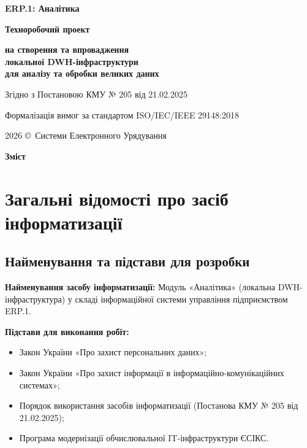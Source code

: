 \documentclass{article}
\newcommand\HUGE[1]{\fontsize{38}{38}\selectfont #1}
\begin{document}
\pagestyle{fancy}

\begin{titlepage}
\AddToShipoutPictureBG*{\AtPageLowerLeft{\color{primary}\rule{\paperwidth}{\paperheight}}}
\color{white}\thispagestyle{empty}\vspace*{3cm}\centering
  {\Huge \textbf{ERP.1: Аналітика} \par} \vspace{1.5cm}
  {\HUGE \textbf{Техноробочий проект} \par} \vspace{1.5cm}
  {\LARGE \textbf{на створення та впровадження \\ локальної DWH-інфраструктури \\ для аналізу та обробки великих даних} \par} \vspace{1.5cm}
  {\large Згідно з Постановою КМУ № 205 від 21.02.2025 \par}
  {\large Формалізація вимог за стандартом ISO/IEC/IEEE 29148:2018 \par}
  \vfill
  {\large 2026 \copyright\ Системи Електронного Урядування \par}
\end{titlepage}

\newpage
\begin{center}
  {\Huge\color{primary}\bfseries Зміст\par}
\end{center}
\vspace{40pt}
\tableofcontents

\newpage
\section{Загальні відомості про засіб інформатизації}

\subsection{Найменування та підстави для розробки}
\textbf{Найменування засобу інформатизації:} Модуль «Аналітика» (локальна DWH-інфраструктура) у складі інформаційної системи управління підприємством ERP.1.

\textbf{Підстави для виконання робіт:}
\begin{itemize}
    \item Закон України «Про захист персональних даних»;
    \item Закон України «Про захист інформації в інформаційно-комунікаційних системах»;
    \item Порядок використання засобів інформатизації (Постанова КМУ № 205 від 21.02.2025);
    \item Програма модернізації обчислювальної IT-інфраструктури ЄСІКС.
\end{itemize}
\end{document}
